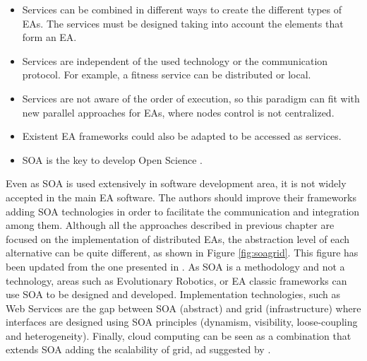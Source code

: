 \begin{itemize}
\item Services can be combined in different ways to create the different types of EAs. The services must be designed taking into account the elements that form an EA. 
\item Services are independent of the used technology or the communication protocol. For example, a fitness service can be distributed or local.
\item Services are not aware of the order of execution, so this paradigm can fit with new parallel approaches for EAs, where nodes control is not centralized. 
\item Existent EA frameworks could also be adapted to be accessed as services.
\item SOA is the key to develop Open Science \cite{Foster2005Science}.
\end{itemize}

Even as SOA is used extensively in software development area, it is not widely accepted in the main EA software. The authors should improve their frameworks adding SOA technologies in order to facilitate the communication and integration among them. Although all the approaches described in previous chapter are focused on the implementation of distributed EAs, the abstraction level of each alternative can be quite different, as shown in Figure \ref{fig:soagrid}. This figure has been updated from the one presented in \cite{SOALIB}. As SOA is a methodology and not a technology, areas such as Evolutionary Robotics, or EA classic frameworks can use SOA to be designed and developed. Implementation technologies, such as Web Services are the gap between SOA (abstract) and grid (infrastructure) where interfaces are designed using SOA principles (dynamism, visibility, loose-coupling and heterogeneity). Finally, cloud computing can be seen as a combination that extends SOA adding the scalability of grid, ad suggested by  \citep{SOALIB}.


